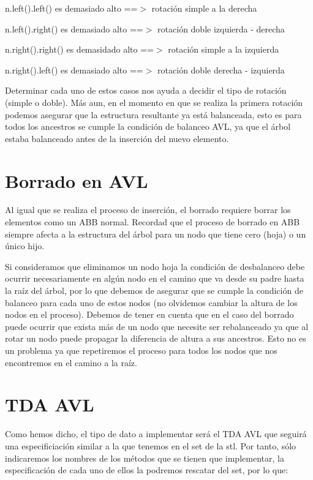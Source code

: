 \begin{DoxyItemize}
\item n.\+left().left() es demasiado alto ==$>$ rotación simple a la derecha \item n.\+left().right() es demasiado alto ==$>$ rotación doble izquierda -\/ derecha \item n.\+right().right() es demasidado alto ==$>$ rotación simple a la izquierda \item n.\+right().left() es demasiado alto ==$>$ rotación doble derecha -\/ izquierda\end{DoxyItemize}
Determinar cada uno de estos casos nos ayuda a decidir el tipo de rotación (simple o doble). Más aun, en el momento en que se realiza la primera rotación podemos asegurar que la estructura resultante ya está balanceada, esto es para todos los ancestros se cumple la condición de balanceo A\+V\+L, ya que el árbol estaba balanceado antes de la inserción del nuevo elemento.\hypertarget{index_Borrar}{}\section{Borrado en A\+V\+L}\label{index_Borrar}
Al igual que se realiza el proceso de inserción, el borrado requiere borrar los elementos como un A\+B\+B normal. Recordad que el proceso de borrado en A\+B\+B siempre afecta a la estructura del árbol para un nodo que tiene cero (hoja) o un único hijo.

Si consideramos que eliminamos un nodo hoja la condición de desbalanceo debe ocurrir necesariamente en algún nodo en el camino que va desde su padre hasta la raíz del árbol, por lo que debemos de asegurar que se cumple la condición de balanceo para cada uno de estos nodos (no olvidemos cambiar la altura de los nodos en el proceso). Debemos de tener en cuenta que en el caso del borrado puede ocurrir que exista más de un nodo que necesite ser rebalanceado ya que al rotar un nodo puede propagar la diferencia de altura a sus ancestros. Esto no es un problema ya que repetiremos el proceso para todos los nodos que nos encontremos en el camino a la raíz.\hypertarget{index_tda}{}\section{T\+D\+A A\+V\+L}\label{index_tda}
Como hemos dicho, el tipo de dato a implementar será el T\+D\+A A\+V\+L que seguirá una especificiación similar a la que tenemos en el set de la stl. Por tanto, sólo indicaremos los nombres de los métodos que se tienen que implementar, la especificación de cada uno de ellos la podremos rescatar del set, por lo que\+:

